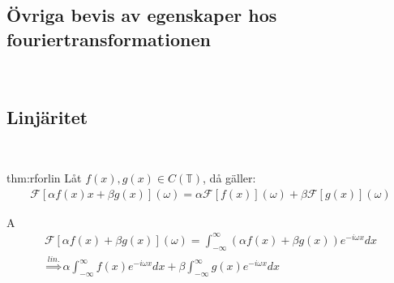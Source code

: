 \subsection{Övriga bevis av egenskaper hos fouriertransformationen}\hfill\\\par
\subsection{Linjäritet}\hfill\\\par
\begin{theo}[Linjär]{thm:rforlin}
  Låt $f(x), g(x)\in C(\mathbb{T})$, då gäller:
  \begin{equation*}
    \begin{gathered}
      \mathcal{F}\left[\alpha f(x)x+\beta g(x)\right](\omega) = \alpha\mathcal{F}\left[f(x)\right](\omega)+\beta\mathcal{F}\left[g(x)\right](\omega)
    \end{gathered}
  \end{equation*}
\end{theo}
\par\bigskip
\begin{prf}
  A
  \begin{equation*}
    \begin{gathered}
      \mathcal{F}\left[\alpha f(x)+\beta g(x)\right](\omega) = \int_{-\infty}^{\infty}\left(\alpha f(x)+\beta g(x)\right)e^{-i\omega x}dx\\
      \stackrel{lin.}{\Rightarrow}\alpha\int_{-\infty}^{\infty}f(x)e^{-i\omega x}dx + \beta\int_{-\infty}^{\infty}g(x)e^{-i\omega x}dx
    \end{gathered}
  \end{equation*}
\end{prf}
\par\bigskip
